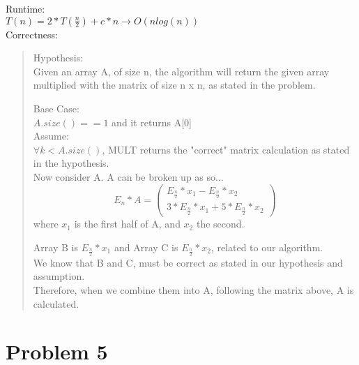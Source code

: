 \documentclass[11pt,letter]{article}
\newcommand{\2}{\{0, 1\}}
\newcommand{\1}{\mathds{1}}
\theoremstyle{definition}
\begin{document}
Runtime: \\
$T(n) = 2 * T(\frac{n}{2}) + c*n \rightarrow O(nlog(n))$\\

Correctness:
\begin{quote}
Hypothesis: \\
Given an array A, of size n, the algorithm will return the given array multiplied with the matrix of size n x n, as stated in the problem.

Base Case:\\

$A.size() == 1$ and it returns A[0] \checkmark \\

Assume: \\
$\forall k < A.size()$, MULT returns the "correct" matrix calculation as stated in the hypothesis.\\

Now consider A. A can be broken up as so...\\
\begin{equation}
	E_n * A = \left(\begin{matrix}
		E_{\frac{n}{2}} * x_1 - E_{\frac{n}{2}} * x_2\\
		3 * E_{\frac{n}{2}} * x_1 + 5 * E_{\frac{n}{2}} * x_2
	\end{matrix}\right) 
\end{equation}
where $x_1$ is the first half of A, and $x_2$ the second.

Array B is $E_{\frac{n}{2}} * x_1$ and Array C is $E_{\frac{n}{2}} * x_2$, related to our algorithm.\\
We know that B and C, must be correct as stated in our hypothesis and assumption.\\
Therefore, when we combine them into A, following the matrix above, A is calculated.


\end{quote}

\section*{Problem 5}
\end{document}
